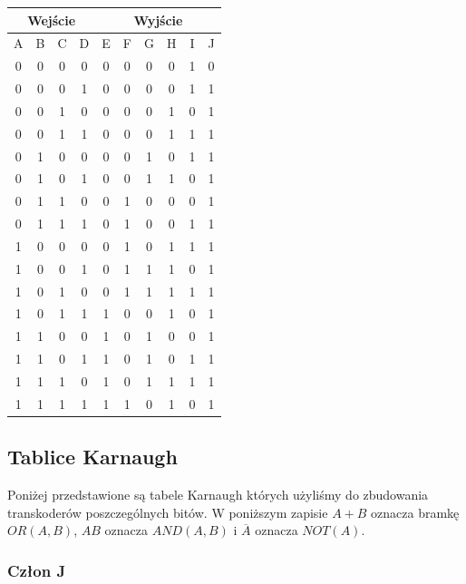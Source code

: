 \documentclass[a4paper]{article}
\begin{document}
\begin{center}
  \begin{tabular}{|c|c|c|c||c|c|c|c|c|c|}
  \hline \multicolumn{4}{|c||}{Wejście} & \multicolumn{6}{|c|}{Wyjście} \\
  \hline A & B & C & D & E & F & G & H & I & J \\
  \hline 0 & 0 & 0 & 0 & 0 & 0 & 0 & 0 & 1 & 0 \\
  \hline 0 & 0 & 0 & 1 & 0 & 0 & 0 & 0 & 1 & 1 \\
  \hline 0 & 0 & 1 & 0 & 0 & 0 & 0 & 1 & 0 & 1 \\
  \hline 0 & 0 & 1 & 1 & 0 & 0 & 0 & 1 & 1 & 1 \\
  \hline 0 & 1 & 0 & 0 & 0 & 0 & 1 & 0 & 1 & 1 \\
  \hline 0 & 1 & 0 & 1 & 0 & 0 & 1 & 1 & 0 & 1 \\
  \hline 0 & 1 & 1 & 0 & 0 & 1 & 0 & 0 & 0 & 1 \\
  \hline 0 & 1 & 1 & 1 & 0 & 1 & 0 & 0 & 1 & 1 \\
  \hline 1 & 0 & 0 & 0 & 0 & 1 & 0 & 1 & 1 & 1 \\
  \hline 1 & 0 & 0 & 1 & 0 & 1 & 1 & 1 & 0 & 1 \\
  \hline 1 & 0 & 1 & 0 & 0 & 1 & 1 & 1 & 1 & 1 \\
  \hline 1 & 0 & 1 & 1 & 1 & 0 & 0 & 1 & 0 & 1 \\
  \hline 1 & 1 & 0 & 0 & 1 & 0 & 1 & 0 & 0 & 1 \\
  \hline 1 & 1 & 0 & 1 & 1 & 0 & 1 & 0 & 1 & 1 \\
  \hline 1 & 1 & 1 & 0 & 1 & 0 & 1 & 1 & 1 & 1 \\
  \hline 1 & 1 & 1 & 1 & 1 & 1 & 0 & 1 & 0 & 1 \\

  \hline 
  \end{tabular}
\end{center}

\pagebreak
\subsection{Tablice Karnaugh}
Poniżej przedstawione są tabele Karnaugh których użyliśmy do zbudowania transkoderów poszczególnych bitów.
 W poniższym zapisie $A+B$ oznacza bramkę $OR(A,B)$, $AB$ oznacza $AND(A,B)$ i $\overline{A}$ oznacza $NOT(A)$.
\subsubsection{Człon J}
\end{document}
